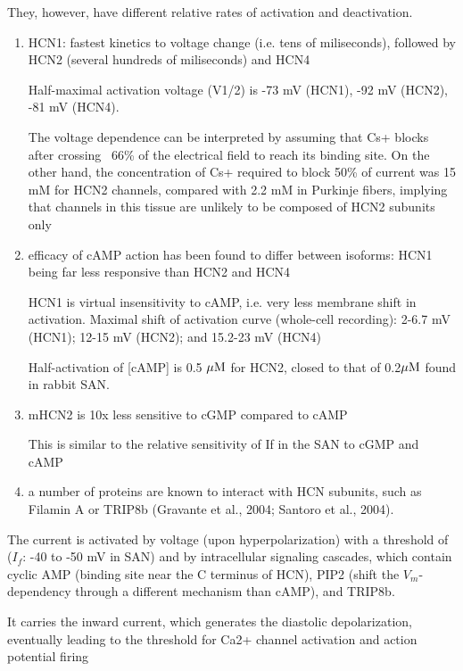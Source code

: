 They, however, have different relative rates of activation and deactivation.
\begin{enumerate}
  \item HCN1: fastest kinetics to voltage change (i.e. tens of miliseconds),
  followed by HCN2 (several hundreds of miliseconds) and HCN4
  
  Half-maximal activation voltage (V1/2) is -73 mV (HCN1), -92 mV (HCN2), -81 mV
  (HCN4).
  
  The voltage dependence can be interpreted by assuming that Cs+ blocks after
  crossing ~66\% of the electrical field to reach its binding site.
  On the other hand, the concentration of Cs+ required to block
50\% of current was 15 mM for HCN2 channels, compared with 2.2 mM in Purkinje
fibers, implying that channels in this tissue are unlikely to be composed of
HCN2 subunits only
  
  \item efficacy of cAMP action has been found to
differ between isoforms: HCN1 being far less responsive than HCN2 and HCN4

HCN1 is virtual insensitivity to cAMP, i.e. very less membrane shift in
activation. Maximal shift of activation curve (whole-cell recording): 2-6.7 mV
(HCN1); 12-15 mV (HCN2); and 15.2-23 mV (HCN4)

Half-activation of [cAMP] is 0.5 ${\mu\text{M}}$ for HCN2, closed to that of
0.2${\mu\text{M}}$ found in rabbit SAN.

  \item mHCN2 is 10x less sensitive to cGMP compared to cAMP
  
  This is similar to the relative sensitivity of If in the SAN to cGMP and cAMP

 \item a number of proteins are known to interact with HCN
subunits, such as Filamin A or TRIP8b
(Gravante et al., 2004; Santoro et al.,
2004).

\end{enumerate}

The current is activated by voltage (upon hyperpolarization) with a threshold of
($I_f$: -40 to -50 mV in SAN) and by intracellular signaling cascades, which
contain cyclic AMP (binding site near the C terminus of HCN), PIP2 (shift the
$V_m$-dependency through a different mechanism than cAMP), and TRIP8b.

It carries the inward current, which generates
the diastolic depolarization, eventually leading to the
threshold for Ca2+ channel activation and action potential firing


